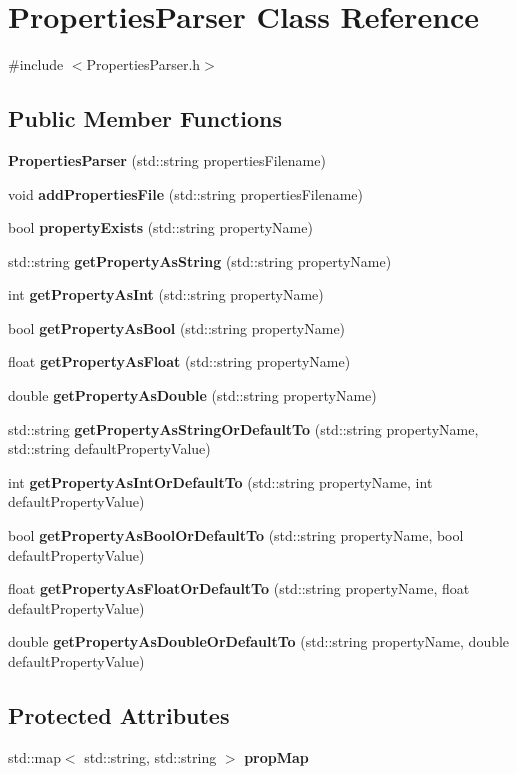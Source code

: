 \section{Properties\+Parser Class Reference}
\label{class_properties_parser}


{\ttfamily \#include $<$Properties\+Parser.\+h$>$}

\subsection*{Public Member Functions}
\begin{DoxyCompactItemize}
\item 
\textbf{ Properties\+Parser} (std\+::string properties\+Filename)
\item 
void \textbf{ add\+Properties\+File} (std\+::string properties\+Filename)
\item 
bool \textbf{ property\+Exists} (std\+::string property\+Name)
\item 
std\+::string \textbf{ get\+Property\+As\+String} (std\+::string property\+Name)
\item 
int \textbf{ get\+Property\+As\+Int} (std\+::string property\+Name)
\item 
bool \textbf{ get\+Property\+As\+Bool} (std\+::string property\+Name)
\item 
float \textbf{ get\+Property\+As\+Float} (std\+::string property\+Name)
\item 
double \textbf{ get\+Property\+As\+Double} (std\+::string property\+Name)
\item 
std\+::string \textbf{ get\+Property\+As\+String\+Or\+Default\+To} (std\+::string property\+Name, std\+::string default\+Property\+Value)
\item 
int \textbf{ get\+Property\+As\+Int\+Or\+Default\+To} (std\+::string property\+Name, int default\+Property\+Value)
\item 
bool \textbf{ get\+Property\+As\+Bool\+Or\+Default\+To} (std\+::string property\+Name, bool default\+Property\+Value)
\item 
float \textbf{ get\+Property\+As\+Float\+Or\+Default\+To} (std\+::string property\+Name, float default\+Property\+Value)
\item 
double \textbf{ get\+Property\+As\+Double\+Or\+Default\+To} (std\+::string property\+Name, double default\+Property\+Value)
\end{DoxyCompactItemize}
\subsection*{Protected Attributes}
\begin{DoxyCompactItemize}
\item 
std\+::map$<$ std\+::string, std\+::string $>$ \textbf{ prop\+Map}
\end{DoxyCompactItemize}


